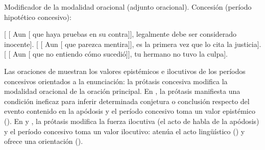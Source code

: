 \begin{exe}
  \ex\label{ex:13-mmoconc} Modificador de la modalidad oracional (adjunto
      oracional). Concesión (período hipotético concesivo):
    \begin{xlist}
      \ex\label{ex:13-mmoconc-a} {}[ [ Aun [ que
          haya pruebas en su contra]], legalmente debe ser considerado
          inocente].
      \ex\label{ex:13-mmoconc-b} {}[ [ Aun [ que
          parezca mentira]], es la primera vez que lo cita la justicia].
      \ex\label{ex:13-mmoconc-c} {}[ [ Aun [ que
          no entiendo cómo sucedió]], tu hermano no tuvo la culpa].
    \end{xlist}
\end{exe}

Las oraciones de  muestran los valores epistémicos e
ilocutivos de los períodos concesivos orientados a la enunciación: la prótasis
concesiva modifica la modalidad oracional de la oración principal. En
, la prótasis manifiesta una condición ineficaz para
inferir determinada conjetura o conclusión respecto del evento contenido en la
apódosis y el período concesivo toma un valor epistémico (). En
 y , la prótasis modifica la fuerza
ilocutiva (el acto de habla de la apódosis) y el período concesivo toma un valor
ilocutivo: atenúa el acto lingüístico () y ofrece una
orientación ().

